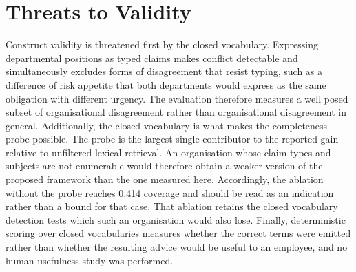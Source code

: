 \documentclass[journal]{IEEEtran}
\begin{document}
\section{Threats to Validity}

Construct validity is threatened first by the closed vocabulary. Expressing departmental positions as typed claims makes conflict detectable and simultaneously excludes forms of disagreement that resist typing, such as a difference of risk appetite that both departments would express as the same obligation with different urgency. The evaluation therefore measures a well posed subset of organisational disagreement rather than organisational disagreement in general. Additionally, the closed vocabulary is what makes the completeness probe possible. The probe is the largest single contributor to the reported gain relative to unfiltered lexical retrieval. An organisation whose claim types and subjects are not enumerable would therefore obtain a weaker version of the proposed framework than the one measured here. Accordingly, the ablation without the probe reaches 0.414 coverage and should be read as an indication rather than a bound for that case. That ablation retains the closed vocabulary detection tests which such an organisation would also lose. Finally, deterministic scoring over closed vocabularies measures whether the correct terms were emitted rather than whether the resulting advice would be useful to an employee, and no human usefulness study was performed.
\end{document}
